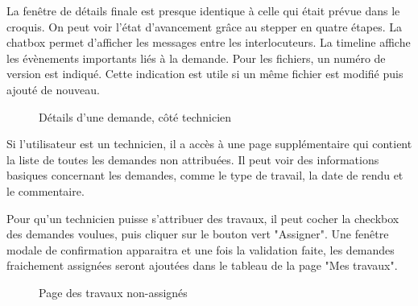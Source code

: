 \documentclass[
    iai, %
    eai, %
]{heig-tb}
\begin{document}
La fenêtre de détails finale est presque identique à celle qui était prévue dans le croquis.
On peut voir l'état d'avancement grâce au stepper en quatre étapes.
La chatbox permet d'afficher les messages entre les interlocuteurs.
La timeline affiche les évènements importants liés à la demande.
Pour les fichiers, un numéro de version est indiqué.
Cette indication est utile si un même fichier est modifié puis ajouté de nouveau.

\begin{figure}[h!]
  \caption{Détails d'une demande, côté technicien}
\end{figure}



Si l'utilisateur est un technicien, il a accès à une page supplémentaire qui contient la liste de toutes les demandes non attribuées.
Il peut voir des informations basiques concernant les demandes, comme le type de travail, la date de rendu et le commentaire.

Pour qu'un technicien puisse s'attribuer des travaux, il peut cocher la checkbox des demandes voulues, puis cliquer sur le bouton vert "Assigner".
Une fenêtre modale de confirmation apparaitra et une fois la validation faite, les demandes fraichement assignées seront ajoutées dans le tableau de la page "Mes travaux".

\begin{figure}[h!]
  \caption{Page des travaux non-assignés}
\end{figure}
\end{document}
